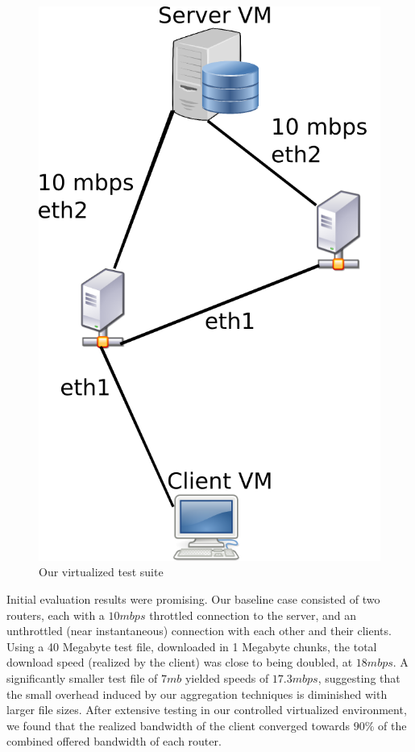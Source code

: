 \documentclass[12pt]{article}
\begin{document}
	\begin{figure}[H]
		\centering
		\includegraphics[keepaspectratio=true,scale=0.3]{InterfaceSetup.png}
		\caption{Our virtualized test suite}
		\label{fig:awesome_image}
	\end{figure}

	Initial evaluation results were promising. Our baseline case consisted of two routers, each with a $10 mbps$ throttled connection to the server, and an unthrottled (near instantaneous) connection with each other and their clients. Using a 40 Megabyte test file, downloaded in 1 Megabyte chunks, the total download speed (realized by the client) was close to being doubled, at $18 mbps$. A significantly smaller test file of $7 mb$ yielded speeds of $17.3 mbps$, suggesting that the small overhead induced by our aggregation techniques is diminished with larger file sizes. After extensive testing in our controlled virtualized environment, we found that the realized bandwidth of the client converged towards $90\%$ of the combined offered bandwidth of each router.
\end{document}
